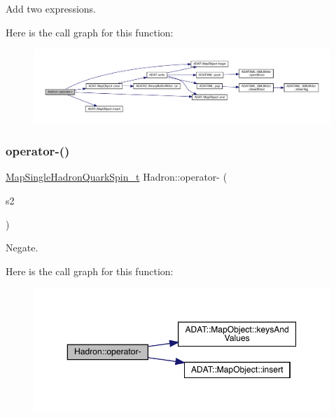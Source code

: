 Add two expressions. 

Here is the call graph for this function\+:
\nopagebreak
\begin{figure}[H]
\begin{center}
\leavevmode
\includegraphics[width=350pt]{d1/daf/namespaceHadron_a168571d9c710321169dad756440c1952_cgraph}
\end{center}
\end{figure}
\mbox{\label{namespaceHadron_af6e03647b0a1cac007a84d630c583dcb}} 
\subsubsection{\texorpdfstring{operator-\/()}{operator-()}\hspace{0.1cm}{\footnotesize\ttfamily [1/6]}}
{\footnotesize\ttfamily \mbox{\hyperlink{namespaceHadron_a22279e56b59508dc8dd2c8991dc911fd}{Map\+Single\+Hadron\+Quark\+Spin\+\_\+t}} Hadron\+::operator-\/ (\begin{DoxyParamCaption}\item[{const \mbox{\hyperlink{namespaceHadron_a22279e56b59508dc8dd2c8991dc911fd}{Map\+Single\+Hadron\+Quark\+Spin\+\_\+t}} \&}]{s2 }\end{DoxyParamCaption})}



Negate. 

Here is the call graph for this function\+:
\nopagebreak
\begin{figure}[H]
\begin{center}
\leavevmode
\includegraphics[width=350pt]{d1/daf/namespaceHadron_af6e03647b0a1cac007a84d630c583dcb_cgraph}
\end{center}
\end{figure}
\mbox{\label{namespaceHadron_a47e695607c9fe7e70da22c43d0065b91}} 
